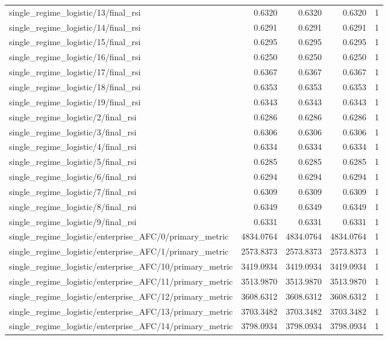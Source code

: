 \begin{table}[h]
\begin{tabular}{lrrrr}
single_regime_logistic/13/final_rsi & 0.6320 & 0.6320 & 0.6320 & 1 \\
single_regime_logistic/14/final_rsi & 0.6291 & 0.6291 & 0.6291 & 1 \\
single_regime_logistic/15/final_rsi & 0.6295 & 0.6295 & 0.6295 & 1 \\
single_regime_logistic/16/final_rsi & 0.6250 & 0.6250 & 0.6250 & 1 \\
single_regime_logistic/17/final_rsi & 0.6367 & 0.6367 & 0.6367 & 1 \\
single_regime_logistic/18/final_rsi & 0.6353 & 0.6353 & 0.6353 & 1 \\
single_regime_logistic/19/final_rsi & 0.6343 & 0.6343 & 0.6343 & 1 \\
single_regime_logistic/2/final_rsi & 0.6286 & 0.6286 & 0.6286 & 1 \\
single_regime_logistic/3/final_rsi & 0.6306 & 0.6306 & 0.6306 & 1 \\
single_regime_logistic/4/final_rsi & 0.6334 & 0.6334 & 0.6334 & 1 \\
single_regime_logistic/5/final_rsi & 0.6285 & 0.6285 & 0.6285 & 1 \\
single_regime_logistic/6/final_rsi & 0.6294 & 0.6294 & 0.6294 & 1 \\
single_regime_logistic/7/final_rsi & 0.6309 & 0.6309 & 0.6309 & 1 \\
single_regime_logistic/8/final_rsi & 0.6349 & 0.6349 & 0.6349 & 1 \\
single_regime_logistic/9/final_rsi & 0.6331 & 0.6331 & 0.6331 & 1 \\
single_regime_logistic/enterprise_AFC/0/primary_metric & 4834.0764 & 4834.0764 & 4834.0764 & 1 \\
single_regime_logistic/enterprise_AFC/1/primary_metric & 2573.8373 & 2573.8373 & 2573.8373 & 1 \\
single_regime_logistic/enterprise_AFC/10/primary_metric & 3419.0934 & 3419.0934 & 3419.0934 & 1 \\
single_regime_logistic/enterprise_AFC/11/primary_metric & 3513.9870 & 3513.9870 & 3513.9870 & 1 \\
single_regime_logistic/enterprise_AFC/12/primary_metric & 3608.6312 & 3608.6312 & 3608.6312 & 1 \\
single_regime_logistic/enterprise_AFC/13/primary_metric & 3703.3482 & 3703.3482 & 3703.3482 & 1 \\
single_regime_logistic/enterprise_AFC/14/primary_metric & 3798.0934 & 3798.0934 & 3798.0934 & 1 \\

\end{tabular}
\end{table}

